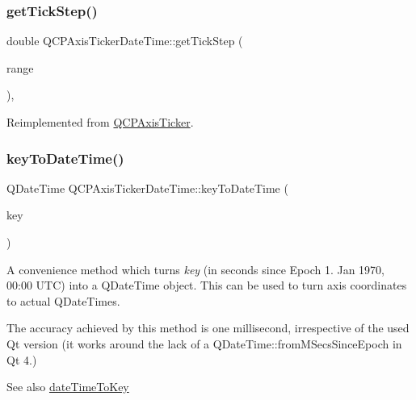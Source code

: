 \subsubsection{\texorpdfstring{get\+Tick\+Step()}{getTickStep()}}
{\footnotesize\ttfamily double Q\+C\+P\+Axis\+Ticker\+Date\+Time\+::get\+Tick\+Step (\begin{DoxyParamCaption}\item[{const \hyperlink{class_q_c_p_range}{Q\+C\+P\+Range} \&}]{range }\end{DoxyParamCaption})\hspace{0.3cm}{\ttfamily [protected]}, {\ttfamily [virtual]}}



Reimplemented from \hyperlink{class_q_c_p_axis_ticker_a910d69bcec2de37e92d8d4e1ecf201e2}{Q\+C\+P\+Axis\+Ticker}.

\mbox{\label{class_q_c_p_axis_ticker_date_time_a4c1761ad057f5564804a53f942629b53}} 
\subsubsection{\texorpdfstring{key\+To\+Date\+Time()}{keyToDateTime()}}
{\footnotesize\ttfamily Q\+Date\+Time Q\+C\+P\+Axis\+Ticker\+Date\+Time\+::key\+To\+Date\+Time (\begin{DoxyParamCaption}\item[{double}]{key }\end{DoxyParamCaption})\hspace{0.3cm}{\ttfamily [static]}}

A convenience method which turns {\itshape key} (in seconds since Epoch 1. Jan 1970, 00\+:00 U\+TC) into a Q\+Date\+Time object. This can be used to turn axis coordinates to actual Q\+Date\+Times.

The accuracy achieved by this method is one millisecond, irrespective of the used Qt version (it works around the lack of a Q\+Date\+Time\+::from\+M\+Secs\+Since\+Epoch in Qt 4.)

\begin{DoxySeeAlso}{See also}
\hyperlink{class_q_c_p_axis_ticker_date_time_aa24f293f16fff0f937bf71f4140033f1}{date\+Time\+To\+Key} 
\end{DoxySeeAlso}
\mbox{\label{class_q_c_p_axis_ticker_date_time_ad52660a82f688395468674d555f6a86b}} 
